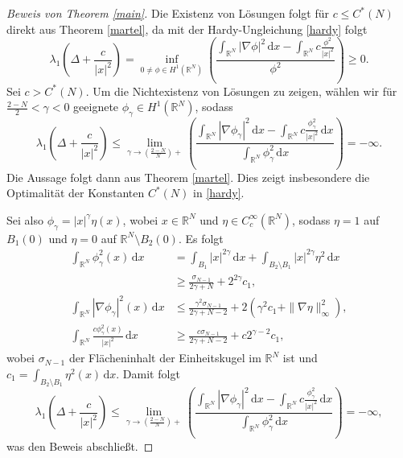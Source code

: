 \documentclass[11pt]{article}
\theoremstyle{break}
\begin{document}
\begin{proof}[Beweis von Theorem \ref{main}]
Die Existenz von Lösungen folgt für $c\le C^*(N)$ direkt aus Theorem \ref{martel}, da mit der Hardy-Ungleichung \eqref{hardy} folgt
\begin{equation}
\lambda_1(\Delta + \frac{c}{|x|^2})= \inf_{0\neq \phi \in H^1(\mathbb R^N)} \left ( \frac{\int_{\mathbb R^N} |\nabla \phi|^2 \, \mathrm dx - \int_{\mathbb R^N} c \frac{\phi^2}{|x|^2}}{\phi^2} \right )\ge 0.
\end{equation}
Sei $c>C^*(N)$. Um die Nichtexistenz von Lösungen zu zeigen, wählen wir für $\frac{2-N}{2}<\gamma <0$ geeignete $\phi_\gamma\in H^1(\mathbb R^N)$, sodass
\begin{equation}
\lambda_1(\Delta + \frac{c}{|x|^2})\le \lim_{\gamma \to (\tfrac{2-N}{N})+} \left ( \frac{\int_{\mathbb R^N} |\nabla \phi_\gamma|^2\, \mathrm dx- \int_{\mathbb R^N} c \frac{\phi^2_{\gamma}}{|x|^2}\, \mathrm dx}{\int_{\mathbb R^N} \phi^2_\gamma  \, \mathrm dx} \right )=-\infty.
\end{equation}
Die Aussage folgt dann aus Theorem \ref{martel}. Dies zeigt insbesondere die Optimalität der Konstanten $C^*(N)$ in \eqref{hardy}.

Sei also $\phi_\gamma= |x|^\gamma \eta(x)$, wobei $x\in \mathbb R^N$ und $\eta\in C_c^\infty(\mathbb R^N)$, sodass $\eta =1$ auf $B_1(0)$ und $\eta=0$ auf $\mathbb R^N\setminus B_2(0)$.  Es folgt
\begin{align*}
\int_{\mathbb R^N} \phi^2_\gamma(x)\, \mathrm dx &= \int_{B_1} |x|^{2\gamma} \, \mathrm dx + \int_{B_2\setminus B_1} |x|^{2\gamma} \eta^2\, \mathrm dx\\
&\ge \frac{\sigma_{N-1}}{2\gamma+N} + 2^{2\gamma} c_1,\\
\int_{\mathbb R^N} |\nabla \phi_\gamma|^2(x)\, \mathrm dx &\le \frac{\gamma^2 \sigma_{N-1}}{2\gamma +N-2}+ 2(\gamma^2 c_1+ \| \nabla \eta\|^2_\infty),\\
\int_{\mathbb R^N} \frac{c\phi_\gamma^2(x)}{|x|^2} \, \mathrm dx &\ge \frac{c\sigma_{N-1}}{2\gamma+N-2} + c 2^{\gamma -2}c_1,
\end{align*}
wobei $\sigma_{N-1}$ der Flächeninhalt der Einheitskugel im $\mathbb R^N$ ist und $c_1=\int_{B_2 \setminus B_1} \eta^2(x)\, \mathrm dx$. Damit folgt
\begin{equation}
\lambda_1(\Delta + \frac{c}{|x|^2}) \le \lim_{\gamma \to (\tfrac{2-N}{N})+} \left ( \frac{\int_{\mathbb R^N} |\nabla \phi_\gamma|^2\, \mathrm dx- \int_{\mathbb R^N} c \frac{\phi^2_{\gamma}}{|x|^2}\, \mathrm dx}{\int_{\mathbb R^N} \phi^2_\gamma  \, \mathrm dx} \right )=-\infty,
\end{equation}
was den Beweis abschließt.


\end{proof}
\end{document}
